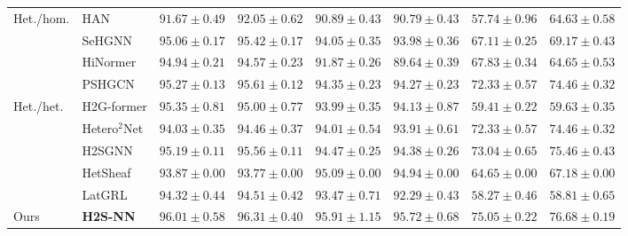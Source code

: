 \documentclass[sigconf,anonymous,review]{acmart}
\newcommand{\method}{\textsc{H2S-NN}}
\begin{document}
\begin{table}[htbp]
{\begin{tabular}{llcccccc}
    \midrule

    \multirow{4}{*}{Het./hom.}
    & HAN
    & $91.67 \pm 0.49$
    & $92.05 \pm 0.62$
    & $90.89 \pm 0.43$
    & $90.79 \pm 0.43$
    & $57.74 \pm 0.96$
    & $64.63 \pm 0.58$ \\

    & SeHGNN
    & $95.06 \pm 0.17$
    & $95.42 \pm 0.17$
    & $94.05 \pm 0.35$
    & $93.98 \pm 0.36$
    & $67.11 \pm 0.25$
    & $69.17 \pm 0.43$ \\

    & HiNormer
    & $94.94 \pm 0.21$
    & $94.57 \pm 0.23$
    & $91.87 \pm 0.26$
    & $89.64 \pm 0.39$
    & $67.83 \pm 0.34$
    & $64.65 \pm 0.53$ \\

    & PSHGCN
    & $95.27 \pm 0.13$
    & $95.61 \pm 0.12$
    & $94.35 \pm 0.23$
    & $94.27 \pm 0.23$
    & $72.33 \pm 0.57$
    & $74.46 \pm 0.32$ \\
    \midrule

    \multirow{5}{*}{Het./het.}
    & H2G-former
    & $95.35 \pm 0.81$
    & $95.00 \pm 0.77$
    & $93.99 \pm 0.35$
    & $94.13 \pm 0.87$
    & $59.41 \pm 0.22$
    & $59.63 \pm 0.35$ \\

    & Hetero$^2$Net
    & $94.03 \pm 0.35$
    & $94.46 \pm 0.37$
    & $94.01 \pm 0.54$
    & $93.91 \pm 0.61$
    & $72.33 \pm 0.57$
    & $74.46 \pm 0.32$ \\

    & H2SGNN
    & $95.19 \pm 0.11$
    & $95.56 \pm 0.11$
    & $94.47 \pm 0.25$
    & $94.38 \pm 0.26$
    & $73.04 \pm 0.65$
    & $75.46 \pm 0.43$ \\

    & HetSheaf
    & $93.87 \pm 0.00$
    & $93.77 \pm 0.00$
    & $95.09 \pm 0.00$
    & $94.94 \pm 0.00$
    & $64.65 \pm 0.00$
    & $67.18 \pm 0.00$ \\

    & LatGRL
    & $94.32 \pm 0.44$
    & $94.51 \pm 0.42$
    & $93.47 \pm 0.71$
    & $92.29 \pm 0.43$
    & $58.27 \pm 0.46$
    & $58.81 \pm 0.65$ \\
    \midrule

    Ours
    & \textbf{\method{}}
    & $\mathbf{96.01 \pm 0.58}$
    & $\mathbf{96.31 \pm 0.40}$
    & $\mathbf{95.91 \pm 1.15}$
    & $\mathbf{95.72 \pm 0.68}$
    & $\mathbf{75.05 \pm 0.22}$
    & $\mathbf{76.68 \pm 0.19}$ \\
    \bottomrule
  \end{tabular}%
  }
\end{table}
\end{document}
